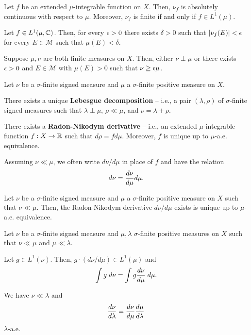 \documentclass[11pt]{article}
\newcommand{\M}{\mathcal{M}}
\begin{document}
\begin{proposition}
Let $f$ be an extended $\mu$-integrable function on $X$. Then, $\nu_f$ is absolutely continuous with respect to $\mu$. Moreover, $\nu_f$ is finite if and only if $f\in L^1(\mu)$.
\end{proposition}

\begin{corollary}
Let $f\in L^1(\mu,\mathbb{C})$. Then, for every $\epsilon>0$ there exists $\delta>0$ such that $|\nu_f(E)|<\epsilon$ for every $E\in\M$ such that $\mu(E)<\delta$.
\end{corollary}

\begin{lemma}
Suppose $\mu,\nu$ are both finite measures on $X$. Then, either $\nu\perp\mu$ or there exists $\epsilon>0$ and $E\in\M$ with $\mu(E)>0$ such that $\nu\geq\epsilon\mu$.
\end{lemma}

\begin{theorem}
Let $\nu$ be a $\sigma$-finite signed measure and $\mu$ a $\sigma$-finite positive measure on $X$. 
\begin{enum}{\alph}
\item There exists a unique \textbf{Lebesgue decomposition} -- i.e., a pair $(\lambda,\rho)$ of $\sigma$-finite signed measures such that $\lambda\perp\mu$, $\rho\ll\mu$, and $\nu=\lambda+\rho$.

\item There exists a \textbf{Radon-Nikodym derivative} -- i.e., an extended $\mu$-integrable function $f: X\to\mathbb{R}$ such that $d\rho=fd\mu$. Moreover, $f$ is unique up to $\mu$-a.e. equivalence.
\end{enum}
\end{theorem}

Assuming $\nu\ll\mu$, we often write $d\nu/d\mu$ in place of $f$ and have the relation
$$d\nu=\dfrac{d\nu}{d\mu}d\mu.$$

\begin{corollary}
Let $\nu$ be a $\sigma$-finite signed measure and $\mu$ a $\sigma$-finite positive measure on $X$ such that $\nu\ll\mu$. Then, the Radon-Nikodym derivative $d\nu/d\mu$ exists is unique up to $\mu$-a.e. equivalence.
\end{corollary}

\begin{proposition}
Let $\nu$ be a $\sigma$-finite signed measure and $\mu,\lambda$ $\sigma$-finite positive measures on $X$ such that $\nu\ll\mu$ and $\mu\ll\lambda$.
\begin{enum}{\alph}
\item Let $g\in L^1(\nu)$. Then, $g\cdot(d\nu/d\mu)\in L^1(\mu)$ and 
$$\int g\;d\nu=\int g\dfrac{d\nu}{d\mu}\;d\mu.$$

\item We have $\nu\ll\lambda$ and 
$$\dfrac{d\nu}{d\lambda}=\dfrac{d\nu}{d\mu}\dfrac{d\mu}{d\lambda}$$
$\lambda$-a.e.
\end{enum}
\end{proposition}
\end{document}
